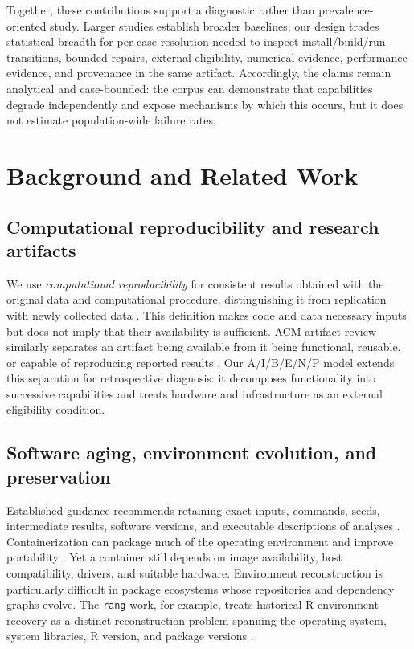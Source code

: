 \documentclass[a4paper,fleqn]{cas-dc}
\begin{document}
Together, these contributions support a diagnostic rather than prevalence-oriented study. Larger studies establish broader baselines; our design trades statistical breadth for per-case resolution needed to inspect install/build/run transitions, bounded repairs, external eligibility, numerical evidence, performance evidence, and provenance in the same artifact. Accordingly, the claims remain analytical and case-bounded: the corpus can demonstrate that capabilities degrade independently and expose mechanisms by which this occurs, but it does not estimate population-wide failure rates.

\section{Background and Related Work}

\subsection{Computational reproducibility and research artifacts}

We use \emph{computational reproducibility} for consistent results obtained with the original data and computational procedure, distinguishing it from replication with newly collected data \citep{nasem2019reproducibility}. This definition makes code and data necessary inputs but does not imply that their availability is sufficient. ACM artifact review similarly separates an artifact being available from it being functional, reusable, or capable of reproducing reported results \citep{acm2020badging}. Our A/I/B/E/N/P model extends this separation for retrospective diagnosis: it decomposes functionality into successive capabilities and treats hardware and infrastructure as an external eligibility condition.

\subsection{Software aging, environment evolution, and preservation}

Established guidance recommends retaining exact inputs, commands, seeds, intermediate results, software versions, and executable descriptions of analyses \citep{sandve2013ten}. Containerization can package much of the operating environment and improve portability \citep{boettiger2015docker}. Yet a container still depends on image availability, host compatibility, drivers, and suitable hardware. Environment reconstruction is particularly difficult in package ecosystems whose repositories and dependency graphs evolve. The \texttt{rang} work, for example, treats historical R-environment recovery as a distinct reconstruction problem spanning the operating system, system libraries, R version, and package versions \citep{chan2023rang}.
\end{document}
